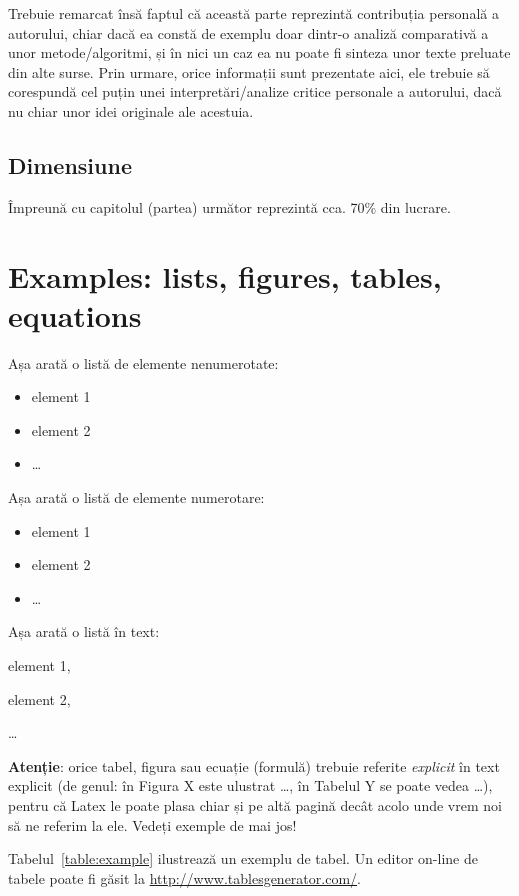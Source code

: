 Trebuie remarcat însă faptul că această parte reprezintă contribuția personală a autorului, chiar dacă ea constă de exemplu doar dintr-o analiză comparativă a unor metode/algoritmi, și în nici un caz ea nu poate fi sinteza unor texte preluate din alte surse. Prin urmare, orice informații sunt prezentate aici, ele trebuie să corespundă cel puțin unei interpretări/analize critice personale a autorului, dacă nu chiar unor idei originale ale acestuia. 

\subsection{Dimensiune}

Împreună cu capitolul (partea) următor reprezintă cca. 70\% din lucrare. 


\section{Examples: lists, figures, tables, equations}

Așa arată o listă de elemente nenumerotate:
\begin{itemize}
  \item element 1
  \item element 2
  \item \dots
\end{itemize}


Așa arată o listă de elemente numerotare:
\begin{itemize}
  \item element 1
  \item element 2
  \item \dots
\end{itemize}


Așa arată o listă în text: 
\begin{inparaenum}[(\itshape 1 \upshape)]
  \item element 1, 
  \item element 2, 
  \item \dots
\end{inparaenum}

\textbf{Atenție}: orice tabel, figura sau ecuație (formulă) trebuie referite \textit{explicit} în text explicit (de genul: în Figura X este ulustrat \dots, în Tabelul Y se poate vedea \dots), pentru că Latex le poate plasa chiar și pe altă pagină decât acolo unde vrem noi să ne referim la ele. Vedeți exemple de mai jos!

Tabelul~\ref{table:example} ilustrează un exemplu de tabel. Un editor on-line de tabele poate fi găsit la \url{http://www.tablesgenerator.com/}. 

